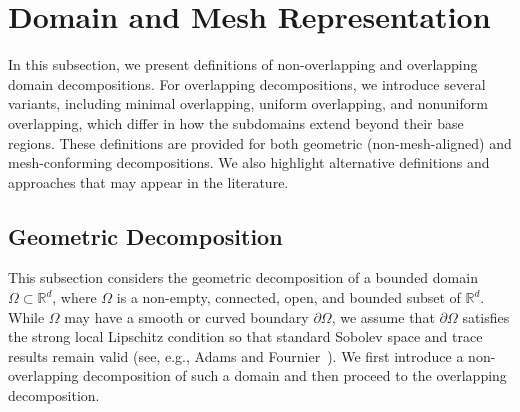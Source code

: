 \chapter{Domain and Mesh Representation}
In this subsection, we present definitions of non-overlapping and overlapping domain decompositions. For overlapping decompositions, we introduce several variants, including minimal overlapping, uniform overlapping, and nonuniform overlapping, which differ in how the subdomains extend beyond their base regions. These definitions are provided for both geometric (non-mesh-aligned) and mesh-conforming decompositions. We also highlight alternative definitions and approaches that may appear in the literature.

\section{Geometric Decomposition}

This subsection considers the geometric decomposition of a bounded domain $\Omega \subset \mathbb{R}^{d}$, where $\Omega$ is a non-empty, connected, open, and bounded subset of $\mathbb{R}^{d}$. While $\Omega$ may have a smooth or curved boundary $\partial\Omega$, we assume that $\partial\Omega$ satisfies the strong local Lipschitz condition so that standard Sobolev space and trace results remain valid (see, e.g., Adams and Fournier~\cite{AdamsFournier2003}). We first introduce a non-overlapping decomposition of such a domain and then proceed to the overlapping decomposition.


